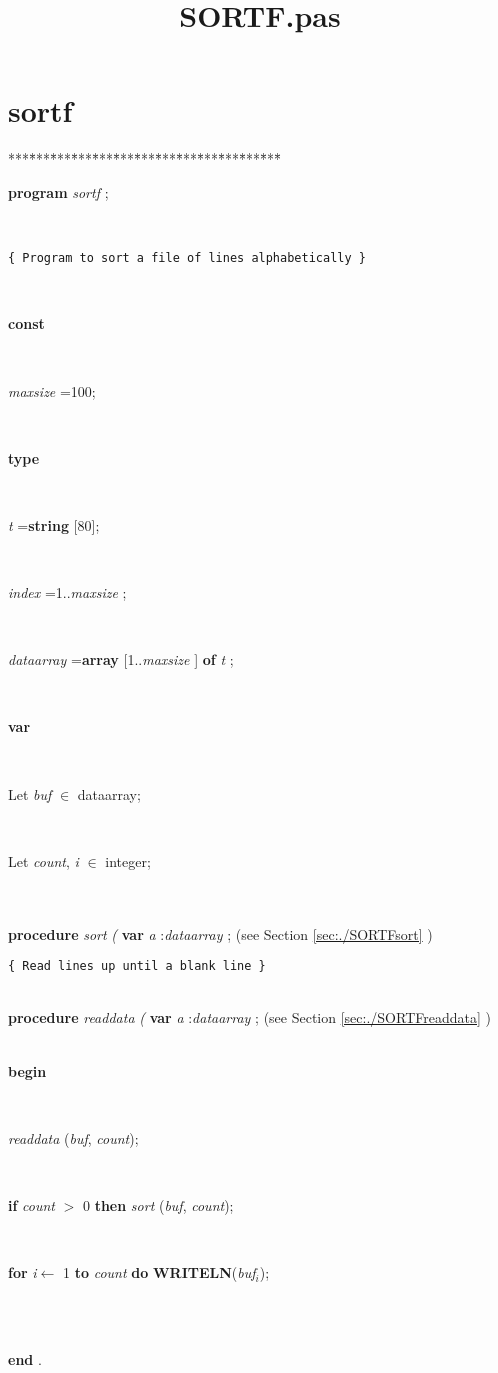 \documentclass[10pt, a4paper]{article}
\title{SORTF.pas}
\begin{document}
\maketitle

\tableofcontents
\section{sortf}
\begin{tabbing}
***\=***\=***\=***\=***\=***\=***\=***\=***\=***\=***\=***\=***\=\kill
\parbox{14cm}{\textsf{\textbf{program}  \textit{sortf} ;}}\\
\parbox{14cm}{\texttt{\small{\{ Program to sort a file of lines alphabetically \}}}}\\
\+\parbox{14cm}{\textsf{\textbf{const} }}\\
\parbox{14cm}{\textsf{\textit{maxsize} =100;}}\\
\<\parbox{14cm}{\textsf{\textbf{type} }}\\
\parbox{14cm}{\textsf{\textit{t} =\textbf{string} [80];}}\\
\parbox{14cm}{\textsf{\textit{index} =1..\textit{maxsize} ;}}\\
\parbox{14cm}{\textsf{\textit{dataarray} =\textbf{array} [1..\textit{maxsize} ] \textbf{of}  \textit{t} ;}}\\
\<\parbox{14cm}{\textsf{\textbf{var} }}\\
\parbox{14cm}{\textsf{Let \textit{buf} $\in$ dataarray;}}\\
\parbox{14cm}{\textsf{Let \textit{count}, \textit{i} $\in$ integer;}}\\
\\
\<\textsf{\textbf{procedure}  \textit{sort} \textit{(} 	\textbf{var}  \textit{a} :\textit{dataarray} ;} (see Section \ref{sec:./SORTFsort} )\\
\parbox{14cm}{\texttt{\small{\{ Read lines up until a blank line \}}}}\\
\<\textsf{\textbf{procedure}  \textit{readdata} \textit{(} 	\textbf{var}  \textit{a} :\textit{dataarray} ;} (see Section \ref{sec:./SORTFreaddata} )\\
\\
\-\<\+\parbox{14cm}{\textsf{\textbf{begin} }}\\
\parbox{14cm}{\textsf{\textit{readdata} (\textit{buf}, \textit{count})}; }\\
\parbox{14cm}{\textsf {\textbf {if } \textsf{\textit{count} $>$ 0} \textbf{ then } \textsf{\textit{sort} (\textit{buf}, \textit{count})}; }}\\
\parbox{14cm}{\textsf {\textbf {for } \textsf{\textit{i}$\leftarrow$ 1} \textbf{ to } \textsf{\textit{count}} \textbf{ do } \textsf{\textbf{WRITELN}(\textit{buf}$_{\textit{i}}$)}; }}\\
\\
\<\-\parbox{14cm}{\textsf{\textbf{end} .}}\\
\end{tabbing}
\end{document}
